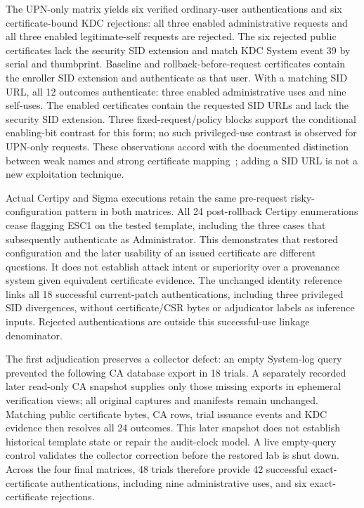 The UPN-only matrix yields six verified ordinary-user authentications and six certificate-bound KDC rejections: all three enabled administrative requests and all three enabled legitimate-self requests are rejected. The six rejected public certificates lack the security SID extension and match KDC System event 39 by serial and thumbprint. Baseline and rollback-before-request certificates contain the enroller SID extension and authenticate as that user. With a matching SID URL, all 12 outcomes authenticate: three enabled administrative uses and nine self-uses. The enabled certificates contain the requested SID URLs and lack the security SID extension. Three fixed-request/policy blocks support the conditional enabling-bit contrast for this form; no such privileged-use contrast is observed for UPN-only requests. These observations accord with the documented distinction between weak names and strong certificate mapping~\cite{microsoft2025strongbinding,microsoft2025pkcasid}; adding a SID URL is not a new exploitation technique.

Actual Certipy and Sigma executions retain the same pre-request risky-configuration pattern in both matrices. All 24 post-rollback Certipy enumerations cease flagging ESC1 on the tested template, including the three cases that subsequently authenticate as Administrator. This demonstrates that restored configuration and the later usability of an issued certificate are different questions. It does not establish attack intent or superiority over a provenance system given equivalent certificate evidence. The unchanged identity reference links all 18 successful current-patch authentications, including three privileged SID divergences, without certificate/CSR bytes or adjudicator labels as inference inputs. Rejected authentications are outside this successful-use linkage denominator.

The first adjudication preserves a collector defect: an empty System-log query prevented the following CA database export in 18 trials. A separately recorded later read-only CA snapshot supplies only those missing exports in ephemeral verification views; all original captures and manifests remain unchanged. Matching public certificate bytes, CA rows, trial issuance events and KDC evidence then resolves all 24 outcomes. This later snapshot does not establish historical template state or repair the audit-clock model. A live empty-query control validates the collector correction before the restored lab is shut down. Across the four final matrices, 48 trials therefore provide 42 successful exact-certificate authentications, including nine administrative uses, and six exact-certificate rejections.

